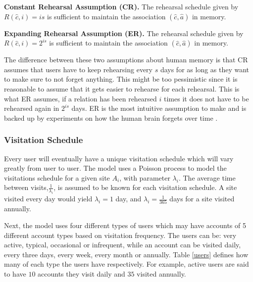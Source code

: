 \begin{requirement}\label{CR}
    \textbf{ Constant Rehearsal Assumption (CR)\cite{naturally-rehearsing}.} The rehearsal schedule given by $R(\hat c, i) = i s$ is sufficient to maintain the association $(\hat c, \hat a)$ in memory.
\end{requirement}

\begin{requirement}\label{ER}
    \textbf{Expanding Rehearsal Assumption (ER)\cite{naturally-rehearsing}.} The rehearsal schedule given by $R(\hat c, i)=2^{i s}$ is sufficient to maintain the association $(\hat c, \hat a)$ in memory.
\end{requirement}

The difference between these two assumptions about human memory is that CR assumes that users have to keep rehearsing every $s$ days for as long as they want to make sure to not forget anything. This might be too pessimistic since it is reasonable to assume that it gets easier to rehearse for each rehearsal. This is what ER assumes, if a relation has been rehearsed $i$ times it does not have to be rehearsed again in $2^{i s}$ days. ER is the most intuitive assumption to make and is backed up by experiments on how the human brain forgets over time \cite{forgetting, human-memory}.

\par 
\subsubsection{Visitation Schedule}
Every user will eventually have a unique visitation schedule which will vary greatly from user to user. The model uses a Poisson process to model the visitations schedule for a given site $A_i$, with parameter $\lambda_i$. The average time between visits,$\frac{1}{\lambda_i}$, is assumed to be known for each visitation schedule. A site visited every day would yield $\lambda_i = 1$ day, and $\lambda_i=\frac{1}{365}$ days for a site visited annually. 
\par Next, the model uses four different types of users which may have accounts of 5 different account types based on visitation frequency. The users can be: very active, typical, occasional or infrequent, while an account can be visited daily, every three days, every week, every month or annually. Table \ref{users} defines how many of each type the users have respectively. For example, active users are said to have $10$ accounts they visit daily and $35$ visited annually.

